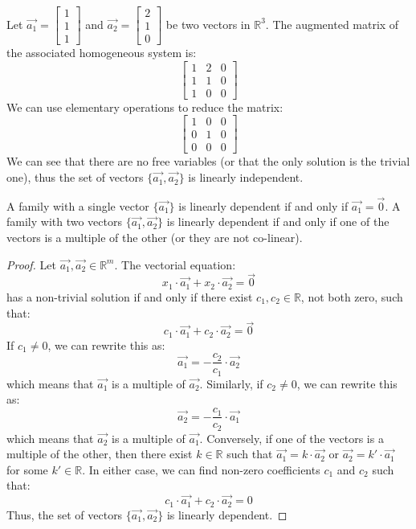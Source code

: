 \begin{eg}
    Let $\vec{a_1} = \begin{bmatrix}1 \\ 1 \\ 1\end{bmatrix}$ and $\vec{a_2} = \begin{bmatrix}2 \\ 1 \\ 0\end{bmatrix}$ be two vectors in $\mathbb{R}^3$. The augmented matrix of the associated homogeneous system is:
    \[
        \begin{bmatrix}
            1 & 2 & 0 \\
            1 & 1 & 0 \\
            1 & 0 & 0
        \end{bmatrix}
    \]
    We can use elementary operations to reduce the matrix:
    \[
        \begin{bmatrix}
            1 & 0 & 0 \\
            0 & 1 & 0 \\
            0 & 0 & 0
        \end{bmatrix}
    \]
    We can see that there are no free variables (or that the only solution is the trivial one), thus the set of vectors $\{\vec{a_1}, \vec{a_2}\}$ is linearly independent.
\end{eg}
A family with a single vector $\{\vec{a_1}\}$ is linearly dependent if and only if $\vec{a_1} = \vec{0}$. A family with two vectors $\{\vec{a_1}, \vec{a_2}\}$ is linearly dependent if and only if one of the vectors is a multiple of the other (or they are not co-linear).
\begin{proof}
    Let $\vec{a_1}, \vec{a_2} \in \mathbb{R}^m$. The vectorial equation:
    \[
        x_1 \cdot \vec{a_1} + x_2 \cdot \vec{a_2} = \vec{0}
    \]
    has a non-trivial solution if and only if there exist $c_1, c_2 \in \mathbb{R}$, not both zero, such that:
    \[
        c_1 \cdot \vec{a_1} + c_2 \cdot \vec{a_2} = \vec{0}
    \]
    If $c_1 \neq 0$, we can rewrite this as:
    \[
        \vec{a_1} = -\frac{c_2}{c_1} \cdot \vec{a_2}
    \]
    which means that $\vec{a_1}$ is a multiple of $\vec{a_2}$. Similarly, if $c_2 \neq 0$, we can rewrite this as:
    \[
        \vec{a_2} = -\frac{c_1}{c_2} \cdot \vec{a_1}
    \]
    which means that $\vec{a_2}$ is a multiple of $\vec{a_1}$. Conversely, if one of the vectors is a multiple of the other, then there exist $k \in \mathbb{R}$ such that $\vec{a_1} = k \cdot \vec{a_2}$ or $\vec{a_2} = k' \cdot \vec{a_1}$ for some $k' \in \mathbb{R}$. In either case, we can find non-zero coefficients $c_1$ and $c_2$ such that:
    \[
        c_1 \cdot \vec{a_1} + c_2 \cdot \vec{a_2} = 0
    \]
    Thus, the set of vectors $\{\vec{a_1}, \vec{a_2}\}$ is linearly dependent.
\end{proof}

